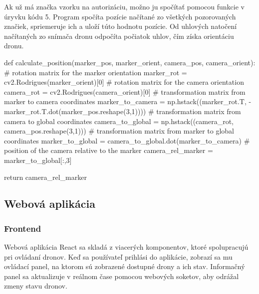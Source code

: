 Ak už má značka vzorku na autorizáciu, možno ju spočítať pomocou funkcie v úryvku kódu 5. Program spočíta pozície načítané zo všetkých pozorovaných značiek, spriemeruje ich a uloží túto hodnotu pozície. Od uhlových natočení načítaných zo snímača dronu odpočíta počiatok uhlov, čím získa orientáciu dronu.
\begin{mypython}[caption={Vypočíta polohu kamery vzhľadom na značku},label=CL-4]
    def calculate_position(marker_pos, marker_orient, camera_pos, camera_orient):
    # rotation matrix for the marker orientation
    marker_rot = cv2.Rodrigues(marker_orient)[0]
    # rotation matrix for the camera orientation
    camera_rot = cv2.Rodrigues(camera_orient)[0]
    # transformation matrix from marker to camera coordinates
    marker_to_camera = np.hstack((marker_rot.T, -marker_rot.T.dot(marker_pos.reshape(3,1))))
    # transformation matrix from camera to global coordinates
    camera_to_global = np.hstack((camera_rot, camera_pos.reshape(3,1)))
    # transformation matrix from marker to global coordinates
    marker_to_global = camera_to_global.dot(marker_to_camera)
    # position of the camera relative to the marker
    camera_rel_marker = marker_to_global[:,3]
    
    return camera_rel_marker
\end{mypython}
\subsection{Webová aplikácia}
\subsubsection{Frontend}
Webová aplikácia React sa skladá z viacerých komponentov, ktoré spolupracujú pri ovládaní dronov. Keď sa používateľ prihlási do aplikácie, zobrazí sa mu ovládací panel, na ktorom sú zobrazené dostupné drony a ich stav. Informačný panel sa aktualizuje v reálnom čase pomocou webových soketov, aby odrážal zmeny stavu dronov.

